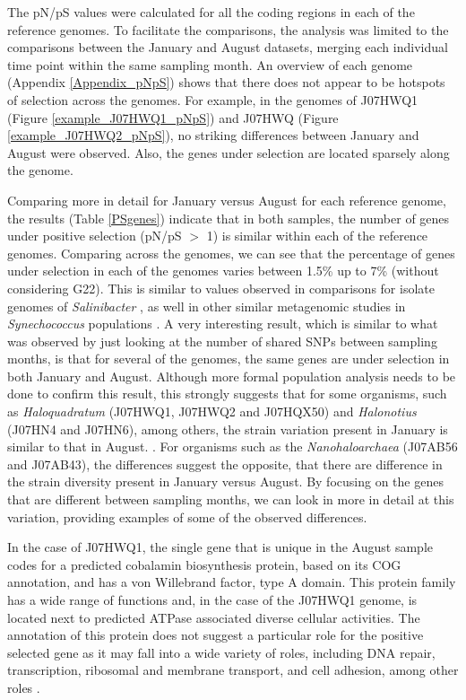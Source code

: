 The pN/pS values were calculated for all the coding regions in each of the reference genomes. To facilitate the comparisons, the analysis was limited to the comparisons between the January and August datasets, merging each individual time point within the same sampling month. An overview of each genome (Appendix \ref{Appendix_pNpS}) shows that there does not appear to be hotspots of selection across the genomes. For example, in the genomes of J07HWQ1 (Figure \ref{example_J07HWQ1_pNpS}) and J07HWQ (Figure \ref{example_J07HWQ2_pNpS}), no striking differences between January and August were observed. Also, the genes under selection are located sparsely along the genome.

Comparing more in detail for January versus August for each reference genome, the results (Table \ref{PSgenes}) indicate that in both samples, the number of genes under positive selection (pN/pS $>$ 1) is similar within each of the reference genomes. Comparing across the genomes, we can see that the percentage of genes under selection in each of the genomes varies between 1.5\% up to 7\% (without considering G22). This is similar to values observed in comparisons for isolate genomes of \textit{Salinibacter} \cite{PeNtildeA:2010ie}, as well in other similar metagenomic studies in \textit{Synechococcus} populations \cite{Tai:2011jo}. A very interesting result, which is similar to what was observed by just looking at the number of shared SNPs between sampling months, is that for several of the genomes, the same genes are under selection in both January and August. Although more formal population analysis needs to be done to confirm this result, this strongly suggests that for some organisms, such as \textit{Haloquadratum} (J07HWQ1, J07HWQ2 and J07HQX50) and \textit{Halonotius} (J07HN4 and J07HN6), among others, the strain variation present in January is similar to that in August. \cite{Vos:2011ux}. For organisms such as the \textit{Nanohaloarchaea} (J07AB56 and J07AB43), the differences suggest the opposite, that there are difference in the strain diversity present in January versus August. By focusing on the genes that are different between sampling months, we can look in more in detail at this variation, providing examples of some of the observed differences.

In the case of J07HWQ1, the single gene that is unique in the August sample codes for a predicted cobalamin biosynthesis protein, based on its COG annotation, and has a von Willebrand factor, type A domain. This protein family has a wide range of functions and, in the case of the J07HWQ1 genome, is located next to predicted ATPase associated diverse cellular activities. The annotation of this protein does not suggest a particular role for the positive selected gene as it may fall into a wide variety of roles, including DNA repair, transcription, ribosomal and membrane transport, and cell adhesion, among other roles \cite{Whittaker:2002ug,Makarova:2010bi}.

